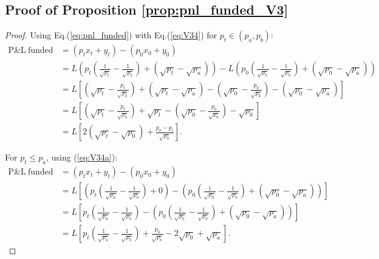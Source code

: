 \documentclass[pdftex,11pt,a4paper] {article}
\begin{document}
\subsection{Proof of Proposition \protect\ref{prop:pnl_funded_V3}}

\label{ap_prop:pnl_funded_V3}

\begin{proof}
Using Eq.(\ref{eq:pnl_funded}) with Eq.(\ref{eq:V34}) for $p_{t} \in (p_{a}, p_{b})$:
\begin{equation} \label{eq:V36}
\begin{split}
\mathrm{ P\&L \ funded} & =\left(p_{t} x_{t} + y_{t}\right) - \left(p_{0}x_{0} +  y_{0}\right)\\
& =L \left(p_{t} \left(\frac{1}{\sqrt{p_{t}}} - \frac{1}{\sqrt{p_{b}}}\right) + \left(\sqrt{p_{t}} - \sqrt{p_{a}}\right)\right) - L \left(p_{0} \left(\frac{1}{\sqrt{p_{0}}} - \frac{1}{\sqrt{p_{b}}}\right) + \left(\sqrt{p_{0}} - \sqrt{p_{a}}\right)\right)\\
& =L \left[ \left( \sqrt{p_{t}} - \frac{p_{t}}{\sqrt{p_{b}}}\right) + \left(\sqrt{p_{t}} - \sqrt{p_{a}}\right) -  \left(\sqrt{p_{0}} - \frac{p_{0}}{\sqrt{p_{b}}}\right) - \left(\sqrt{p_{0}} - \sqrt{p_{a}}\right)\right]\\
& =L \left[ \left( \sqrt{p_{t}} - \frac{p_{t}}{\sqrt{p_{b}}}\right) + \sqrt{p_{t}}  -  \left(\sqrt{p_{0}} - \frac{p_{0}}{\sqrt{p_{b}}}\right) - \sqrt{p_{0}}\right]\\
& =L \left[ 2\left(\sqrt{p_{t}} -\sqrt{p_{0}} \right)  +   \frac{p_{0}-p_{t}}{\sqrt{p_{b}}}\right].
\end{split}
\end{equation}


For $p_{t} \leq p_{a}$, using (\ref{eq:V34a}):
\begin{equation} \label{eq:V36a}
\begin{split}
\mathrm{ P\&L \ funded} & = \left(p_{t} x_{t} + y_{t} \right) - \left(p_{0} x_{0} + y_{0}\right)\\
& = L \left[ \left(p_{t} \left(\frac{1}{\sqrt{p_{a}}} - \frac{1}{\sqrt{p_{b}}}\right) +0\right) - \left(p_{0} \left(\frac{1}{\sqrt{p_{0}}} - \frac{1}{\sqrt{p_{b}}}\right)  + \left(\sqrt{p_{0}} - \sqrt{p_{a}}\right)\right) \right]\\
& = L \left[ p_{t} \left(\frac{1}{\sqrt{p_{a}}} - \frac{1}{\sqrt{p_{b}}}\right) - \left(p_{0} \left(\frac{1}{\sqrt{p_{0}}} - \frac{1}{\sqrt{p_{b}}}\right)  + \left(\sqrt{p_{0}} - \sqrt{p_{a}}\right)\right) \right]\\
& = L \left[ p_{t} \left(\frac{1}{\sqrt{p_{a}}} - \frac{1}{\sqrt{p_{b}}}\right) + \frac{p_{0}}{\sqrt{p_{b}}}  - 2\sqrt{p_{0}} + \sqrt{p_{a}}\right].
\end{split}
\end{equation}



\end{proof}
\end{document}
